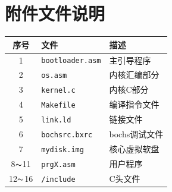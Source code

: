 \documentclass[logo,reportComp]{thesis}
\begin{document}
\section{附件文件说明}
\begin{center}
\begin{tabular}{|c|l|l|}\hline
序号 & 文件 & 描述 \\\hline
1 & \verb'bootloader.asm' & 主引导程序\\\hline
2 & \verb'os.asm' & 内核汇编部分\\\hline
3 & \verb'kernel.c' & 内核C部分\\\hline
4 & \verb'Makefile' & 编译指令文件\\\hline
5 & \verb'link.ld' & 链接文件\\\hline
6 & \verb'bochsrc.bxrc' & bochs调试文件\\\hline
7 & \verb'mydisk.img' & 核心虚拟软盘\\\hline
8$\thicksim$11 & \verb'prgX.asm' & 用户程序\\\hline
12$\thicksim$16 & \verb'/include' & C头文件\\\hline
\end{tabular}
\end{center}
\end{document}
